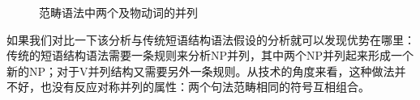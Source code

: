 \begin{exe}
\begin{xlist}[iv.]
\begin{exe}
\begin{xlist}[iv.]
\begin{figure}
\centerline{%
}
\caption{\label{Abb-CG-Koordination-V}范畴语法中两个及物动词的并列}
\end{figure}%

如果我们对比一下该分析与传统短语结构语法假设的分析就可以发现优势在哪里：传统的短语结构语法需要一条规则来分析NP并列，其中两个NP并列起来形成一个新的NP；对于V并列结构又需要另外一条规则。从技术的角度来看，这种做法并不好，也没有反应对称并列的属性：两个句法范畴相同的符号互相组合。 


\end{xlist}
\end{exe}
\end{xlist}
\end{exe}
